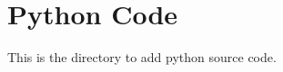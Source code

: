 \chapter{Python Code}
\hypertarget{md__r_e_a_d_m_e}{}\label{md__r_e_a_d_m_e}
\label{md__r_e_a_d_m_e_autotoc_md0}%
%


This is the directory to add python source code. 
